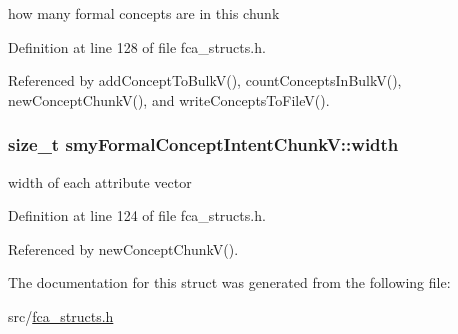 how many formal concepts are in this chunk 



\-Definition at line 128 of file fca\-\_\-structs.\-h.



\-Referenced by add\-Concept\-To\-Bulk\-V(), count\-Concepts\-In\-Bulk\-V(), new\-Concept\-Chunk\-V(), and write\-Concepts\-To\-File\-V().

\hypertarget{structsmyFormalConceptIntentChunkV_a34213d18382955bee724884cd2bfd82c}{
\subsubsection[{width}]{\setlength{\rightskip}{0pt plus 5cm}size\-\_\-t {\bf smy\-Formal\-Concept\-Intent\-Chunk\-V\-::width}}}\label{structsmyFormalConceptIntentChunkV_a34213d18382955bee724884cd2bfd82c}


width of each attribute vector 



\-Definition at line 124 of file fca\-\_\-structs.\-h.



\-Referenced by new\-Concept\-Chunk\-V().



\-The documentation for this struct was generated from the following file\-:\begin{DoxyCompactItemize}
\item 
src/\hyperlink{fca__structs_8h}{fca\-\_\-structs.\-h}\end{DoxyCompactItemize}
